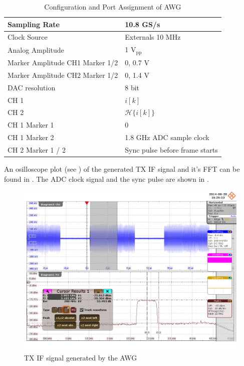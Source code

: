 \begin{table}[h]
  \centering
  \begin{tabular}{|l|l|}
    \hline
    Sampling Rate & 10.8 GS/s \\ \hline
    Clock Source & Externals 10 MHz \\ \hline
    Analog Amplitude & 1 $\text{V}_{\text{pp}}$ \\ \hline
    Marker Amplitude CH1 Marker 1/2 & 0, 0.7 V \\ \hline
    Marker Amplitude CH2 Marker 1/2 & 0, 1.4 V \\ \hline
    \gls{DAC} resolution & 8 bit \\ \hline
    CH 1 & $i[k]$ \\ \hline
    CH 2 & $\mathcal{H}\{i[k]\}$ \\ \hline
    CH 1 Marker 1 & 0 \\ \hline
    CH 1 Marker 2 & 1.8 GHz \gls{ADC} sample clock \\ \hline
    CH 2 Marker 1 / 2 & Sync pulse before frame starts \\ \hline
  \end{tabular}
  \caption{Configuration and Port Assignment of \gls{AWG}}
  \label{tab:res_450}
\end{table}

An osilloscope plot (see ) of the generated
\gls{TX} \gls{IF} signal and it's \gls{FFT} can be found in
.
The \gls{ADC} clock signal and the sync pulse are shown
in . \\

\begin{figure}[p]
  \centering
  \includegraphics[width=\textwidth]{figures/osci/res_450_awg_analog}
  \caption{\gls{TX} \gls{IF} signal generated by the \gls{AWG}}
  \label{fig:res_450_awg_analog}
\end{figure}

